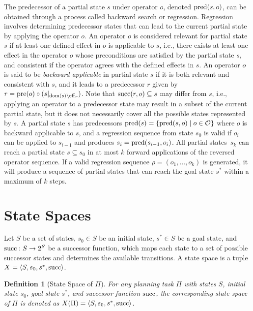 \documentclass[ppgc,diss,english]{iiufrgs}
\newtheorem{definition}{Definition}
\newcommand{\pp}[2][noinline]{\todo[color=purple!50,linecolor={purple!100},#1,fancyline,author=Pedro]{#2}}
\begin{document}
The predecessor of a partial state $s$ under operator $o$, denoted $\operatorname{pred}(s,o)$, can be obtained through a process called backward search or regression. Regression involves determining predecessor states that can lead to the current partial state by applying the operator $o$. An operator $o$ is considered relevant for partial state $s$ if at least one defined effect in $o$ is applicable to $s$, i.e., there exists at least one effect in the operator $o$ whose preconditions are satisfied by the partial state $s$, and consistent if the operator agrees with the defined effects in $s$. An operator $o$ is said to be \emph{backward applicable} in partial state $s$ if it is both relevant and consistent with $s$, and it leads to a predecessor $r$ given by $r=\operatorname{pre}(o)\circ (s|_{\operatorname{dom}(s)\setminus\operatorname{eff}_r})$\pp{$eff_r$ or $eff_o$?}. Note that $\operatorname{succ}(r,o)\subseteq s$ may differ from $s$, i.e., applying an operator to a predecessor state may result in a subset of the current partial state, but it does not necessarily cover all the possible states represented by $s$.
A partial state $s$ has predecessors $\operatorname{pred}(s)=\{{\operatorname{pred}(s,o)\mid o\in \mathcal{O}}\}$ where $o$ is backward applicable to $s$, and a regression sequence from state $s_0$ is valid if $o_i$ can be applied to $s_{i-1}$ and produces $s_i=\operatorname{pred}(s_{i-1},o_i)$. All partial states~$s_k$ can reach a partial state $s\subseteq s_0$ in at most $k$ forward applications of the reversed operator sequence.
If a valid regression sequence $\rho = (o_1, \ldots, o_k)$ is generated, it will produce a sequence of partial states that can reach the goal state $s^*$ within a maximum of $k$ steps.



\section{State Spaces}
\label{background-state-spaces}

Let $S$ be a set of states, $s_0 \in S$ be an initial state, $s^{*} \in S$ be a goal state, and $\operatorname{succ} : S \to 2^S$ be a successor function, which maps each state to a set of possible successor states and determines the available transitions. A state space is a tuple $X = \langle S, s_0, s^{*}, \operatorname{succ} \rangle$.
\begin{definition}[State Space of $\Pi$]
For any planning task $\Pi$ with states $S$, initial state $s_0$, goal state $s^{*}$, and successor function $\operatorname{succ}$, the corresponding state space of $\Pi$ is denoted as $X(\Pi) = \langle S, s_0, s^{*}, \operatorname{succ} \rangle$.
\end{definition}
\end{document}

